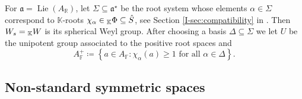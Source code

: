 \documentclass[12pt]{amsart}
\newcommand{\F}{\mathbb{F} }
\newcommand{\R}{\mathbb{R} }
\newcommand{\K}{\mathbb{K}}
\newcommand{\fraka}{\mathfrak{a}}
\newcommand{\KPhi}{\vphantom{\Phi}_{\K}\Phi}
\newcommand{\KW}{\vphantom{W}_{\K}W}
\numberwithin{equation}{section}
\theoremstyle{remark} %
\begin{document}
For $\fraka = \operatorname{Lie}(A_\R)$, let $\Sigma \subseteq \fraka^\star$ be the root system whose elements $\alpha \in \Sigma$ correspond to $\K$-roots $\chi_\alpha \in \KPhi \subseteq \hat{S}$, see Section \ref{I-sec:compatibility} in \cite{AppAGRCF}. Then $W_s=\KW$ is its spherical Weyl group. After choosing a basis $\Delta \subseteq \Sigma$ we let $U$ be the unipotent group associated to the positive root spaces and
$$
A_\F^+ \coloneqq \left\{ a\in A_\F \colon \chi_\alpha(a) \geq 1 \text{ for all } \alpha \in \Delta \right\}.
$$ 


\subsection{Non-standard symmetric spaces}
\end{document}
